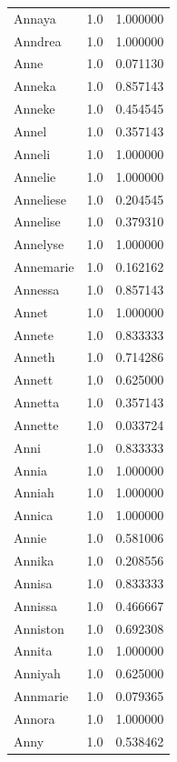 \documentclass[
  letterpaper,
  DIV=11,
  numbers=noendperiod]{scrreprt}
\begin{document}
\begin{tabular}{lrr}
Annaya          &   1.0 &   1.000000 \\
Anndrea         &   1.0 &   1.000000 \\
Anne            &   1.0 &   0.071130 \\
Anneka          &   1.0 &   0.857143 \\
Anneke          &   1.0 &   0.454545 \\
Annel           &   1.0 &   0.357143 \\
Anneli          &   1.0 &   1.000000 \\
Annelie         &   1.0 &   1.000000 \\
Anneliese       &   1.0 &   0.204545 \\
Annelise        &   1.0 &   0.379310 \\
Annelyse        &   1.0 &   1.000000 \\
Annemarie       &   1.0 &   0.162162 \\
Annessa         &   1.0 &   0.857143 \\
Annet           &   1.0 &   1.000000 \\
Annete          &   1.0 &   0.833333 \\
Anneth          &   1.0 &   0.714286 \\
Annett          &   1.0 &   0.625000 \\
Annetta         &   1.0 &   0.357143 \\
Annette         &   1.0 &   0.033724 \\
Anni            &   1.0 &   0.833333 \\
Annia           &   1.0 &   1.000000 \\
Anniah          &   1.0 &   1.000000 \\
Annica          &   1.0 &   1.000000 \\
Annie           &   1.0 &   0.581006 \\
Annika          &   1.0 &   0.208556 \\
Annisa          &   1.0 &   0.833333 \\
Annissa         &   1.0 &   0.466667 \\
Anniston        &   1.0 &   0.692308 \\
Annita          &   1.0 &   1.000000 \\
Anniyah         &   1.0 &   0.625000 \\
Annmarie        &   1.0 &   0.079365 \\
Annora          &   1.0 &   1.000000 \\
Anny            &   1.0 &   0.538462 \\

\end{tabular}
\end{document}
